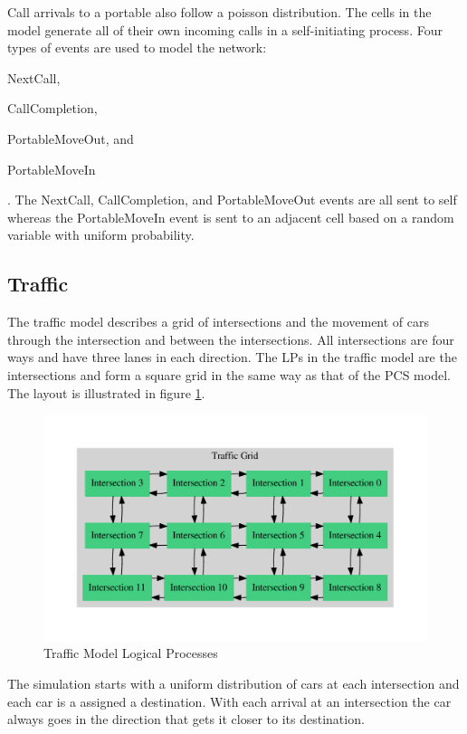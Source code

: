 \documentclass[11pt]{book}
\begin{document}
Call arrivals to a portable also follow a poisson distribution. The cells in the model
generate all of their own incoming calls in a self-initiating process.
Four types of events are used to model the network: \begin{inparaenum}[(1)] \item NextCall,
\item CallCompletion, \item PortableMoveOut, and \item PortableMoveIn \end{inparaenum}.
The NextCall, CallCompletion, and PortableMoveOut events are all sent to self whereas
the PortableMoveIn event is sent to an adjacent cell based on a random variable with
uniform probability.

\subsection{Traffic}

The traffic model describes a grid of intersections and the movement of cars through
the intersection and between the intersections. All intersections are four ways and have
three lanes in each direction. The LPs in the traffic model are the intersections and form
a square grid in the same way as that of the PCS model. The layout is illustrated in
figure \ref{traffic_model_lps}.

\begin{figure}[H]
    \centering
    \includegraphics[width=\textwidth]{figs/graphviz/traffic_model.pdf}
    \caption{Traffic Model Logical Processes}\label{traffic_model_lps}
\end{figure}

The simulation starts with a uniform distribution of cars at each intersection and each
car is a assigned a destination. With each arrival at an intersection the car always
goes in the direction that gets it closer to its destination.
\end{document}
